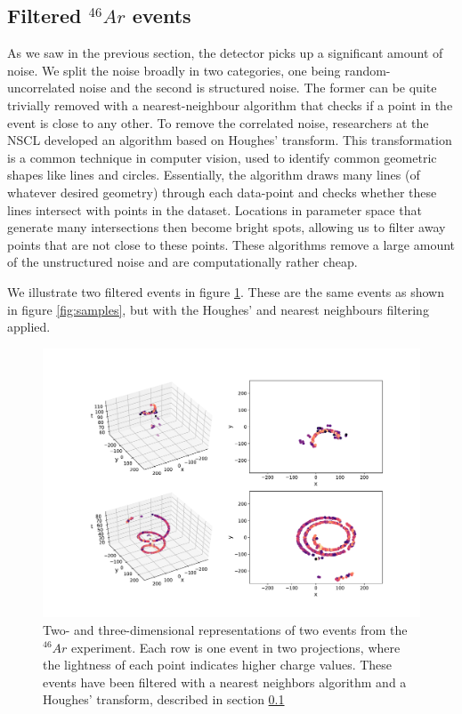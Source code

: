 \subsection{Filtered \texorpdfstring{${}^{46}Ar$}{46Ar} events}\label{sec:filtered}

As we saw in the previous section, the detector picks up a significant amount of noise. We split the noise broadly in two categories,  one being random-uncorrelated noise and the second is structured noise. The former can be quite trivially removed with a nearest-neighbour algorithm that checks if a point in the event is close to any other. To remove the correlated noise, researchers at the NSCL developed an algorithm based on Houghes' transform. This transformation is a common technique in computer vision, used to identify common geometric shapes like lines and circles. Essentially, the algorithm draws many lines (of whatever desired geometry) through each data-point and checks whether these lines intersect with points in the dataset. Locations in parameter space that generate many intersections then become bright spots, allowing us to filter away points that are not close to these points. These algorithms remove a large amount of the unstructured noise and are computationally rather cheap.

We illustrate two filtered events in figure \ref{fig:samples_filtered}. These are the same events as shown in figure \ref{fig:samples}, but with the Houghes' and nearest neighbours filtering applied. 

\begin{figure}[H]
\centering
\includegraphics[width=\textwidth]{../plots/display_eventsclean_.pdf}
\caption[Displaying filtered events in 2D and 3D]{Two- and three-dimensional representations of two events from the ${}^{46}Ar$ experiment. Each row is one event in two projections, where the lightness of each point indicates higher charge values. These events have been filtered with a nearest neighbors algorithm and a Houghes' transform, described in section \ref{sec:filtered}}\label{fig:samples_filtered}
\end{figure}
